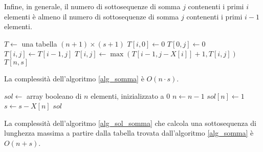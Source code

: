 Infine, in generale, il numero di sottosequenze di somma $j$ contenenti i primi $i$ elementi \`e almeno il numero di sottosequenze di somma $j$ contenenti i primi $i-1$ elementi.

\begin{algorithm}
\begin{algorithmic}
    \State $T \gets$ una tabella $(n+1) \times (s+1)$
        \State $T[i,0] \gets 0$
    \EndFor
        \State $T[0,j] \gets 0$
    \EndFor
            \State $T[i,j] \gets T[i-1, j]$
                \State $T[i,j] \gets \max \left( T \left[ i-1,j-X[i] \right] + 1, T[i,j] \right)$
            \EndIf
        \EndFor
    \EndFor
    \State \Return $T[n,s]$
\EndFunction
\end{algorithmic}
\caption{\label{alg_somma}trovare la lunghezza massima di una sottosequenza di somma $s$}
\end{algorithm}

La complessit\`a dell'algoritmo \ref{alg_somma} \`e $O(n \cdot s)$.

\begin{algorithm}
\begin{algorithmic}
    \State $sol \gets$ array booleano di $n$ elementi, inizializzato a 0
            \State $n \gets n - 1$
        \Else
            \State $sol[n] \gets 1$
            \State $s \gets s - X[n]$
        \EndIf
    \EndWhile
    \State \Return $sol$
\EndFunction
\end{algorithmic}
\caption{\label{alg_sol_somma}trovare una sottosequenza di lunghezza massima e somma $s$}
\end{algorithm}

La complessit\`a dell'algoritmo \ref{alg_sol_somma} che calcola una sottosequenza di lunghezza massima a partire dalla tabella trovata dall'algoritmo \ref{alg_somma} \`e $O(n + s)$.

